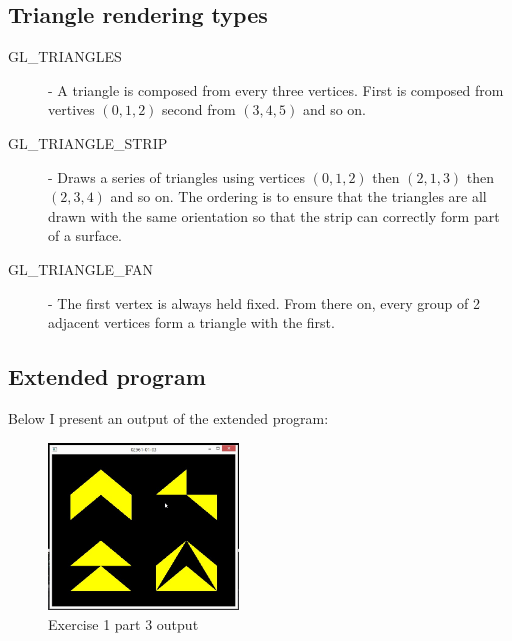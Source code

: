 \subsection{Triangle rendering types}
\begin{description}
	\item[GL\_TRIANGLES] - A triangle is composed from every three vertices. First is composed 
	from vertives $(0,1,2)$ second from $(3,4,5)$ and so on. 
	\item[GL\_TRIANGLE\_STRIP] - Draws a series of triangles using vertices $(0,1,2)$ then $(2,1,3)$ then
	$(2,3,4)$ and so on. The ordering is to ensure that the triangles are all drawn with the same
	orientation so that the strip can correctly form part of a surface.
	\item[GL\_TRIANGLE\_FAN] - The first vertex is always held fixed. From there on, every group of
	2 adjacent vertices form a triangle with the first.
\end{description}
\subsection{Extended program}
Below I present an output of the extended program:
\begin{figure}[ht!]
	\begin{center}
		\includegraphics[width=0.45\textwidth]{figures/exercise_1_part_3}
	\end{center}
	\caption{Exercise 1 part 3 output}
\end{figure} 
\clearpage


